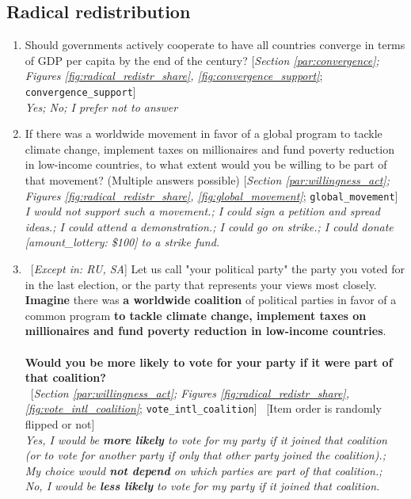  \subsection*{Radical redistribution} 
 \begin{enumerate}[resume] 
\item  \label{q:convergence_support} Should governments actively cooperate to have all countries converge in terms of GDP per capita by the end of the century? [\textit{Section \ref{par:convergence}; Figures \ref{fig:radical_redistr_share}, \ref{fig:convergence_support}}; 
\verb|convergence_support|]
  \\ \textit{Yes; No; I prefer not to answer}

\item  \label{q:global_movement} If there was a worldwide movement in favor of a global program to tackle climate change, implement taxes on millionaires and fund poverty reduction in low-income countries, to what extent would you be willing to be part of that movement? (Multiple answers possible) [\textit{Section \ref{par:willingness_act}; Figures \ref{fig:radical_redistr_share}, \ref{fig:global_movement}}; 
\verb|global_movement|]
  \\ \textit{I would \textit{not} support such a movement.; I could sign a petition and spread ideas.; I could attend a demonstration.; I could go on strike.; I could donate [amount\_lottery: \$100] to a strike fund.}

\item ~[\textit{Except in: RU, SA}] \label{q:vote_intl_coalition} Let us call "your political party" the party you voted for in the last election, or the party that represents your views most closely.~\\\textbf{Imagine }there was \textbf{a worldwide coalition} of political parties in favor of a common program \textbf{to tackle climate change, implement taxes on millionaires and fund poverty reduction in low-income countries}.~\\\\\textbf{Would you be more likely 
to vote for your party if it were part of that coalition?}\\ 
~[\textit{Section \ref{par:willingness_act}; Figures \ref{fig:radical_redistr_share}, \ref{fig:vote_intl_coalition}}; 
\verb|vote_intl_coalition|]
~[Item order is randomly flipped or not]
  \\ \textit{Yes, I would be \textbf{more likely} to vote for my party if it joined that coalition (or to vote for another party if only that other party joined the coalition).; \\My choice would \textbf{not depend} on which parties are part of that coalition.; \\No, I would be \textbf{less likely} to vote for my party if it joined that coalition.}


\end{enumerate}
